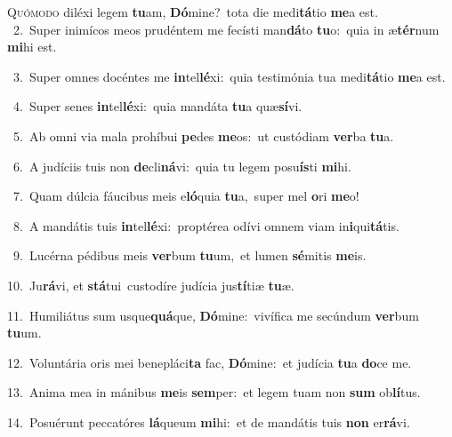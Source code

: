\lettrine{\initial\textcolor{\initialcolor}{Q}}{uómodo} diléxi legem \textbf{tu}\-am, \textbf{Dó}\-mine?~\star tota die medi\-\textbf{tá}\-tio \textbf{me}\-a est.\\
{\numbfont\textcolor{\numbcolor}{~2.}}~Super inimícos meos prudéntem me fecísti man\-\textbf{dá}\-to \textbf{tu}\-o:~\star quia in æ\-\textbf{tér}\-num \textbf{mi}\-hi est.\par
{\numbfont\textcolor{\numbcolor}{~3.}}~Super omnes docéntes me \textbf{in}\-tel\-\textbf{lé}\-xi:~\star quia testimónia tua medi\-\textbf{tá}\-tio \textbf{me}\-a est.\par
{\numbfont\textcolor{\numbcolor}{~4.}}~Super senes \textbf{in}\-tel\-\textbf{lé}\-xi:~\star quia mandáta \textbf{tu}\-a quæ\-\textbf{sí}\-vi.\par
{\numbfont\textcolor{\numbcolor}{~5.}}~Ab omni via mala prohíbui \textbf{pe}\-des \textbf{me}\-os:~\star ut custódiam \textbf{ver}\-ba \textbf{tu}\-a.\par
{\numbfont\textcolor{\numbcolor}{~6.}}~A judíciis tuis non \textbf{de}\-cli\-\textbf{ná}\-vi:~\star quia tu legem posu\-\textbf{ís}\-ti \textbf{mi}\-hi.\par
{\numbfont\textcolor{\numbcolor}{~7.}}~Quam dúlcia fáucibus meis e\-\textbf{ló}\-quia \textbf{tu}\-a,~\star super mel \textbf{o}\-ri \textbf{me}\-o!\par
{\numbfont\textcolor{\numbcolor}{~8.}}~A mandátis tuis \textbf{in}\-tel\-\textbf{lé}\-xi:~\star proptérea odívi omnem viam in\-\textbf{i}\-qui\-\textbf{tá}\-tis.\par
{\numbfont\textcolor{\numbcolor}{~9.}}~Lucérna pédibus meis \textbf{ver}\-bum \textbf{tu}\-um,~\star et lumen \textbf{sé}\-mitis \textbf{me}\-is.\par
{\numbfont\textcolor{\numbcolor}{10.}}~Ju\-\textbf{rá}\-vi, et \textbf{stá}\-tui~\star custodíre judícia jus\-\textbf{tí}\-tiæ \textbf{tu}\-æ.\par
{\numbfont\textcolor{\numbcolor}{11.}}~Humiliátus sum usque\-\textbf{quá}\-que, \textbf{Dó}\-mine:~\star vivífica me secúndum \textbf{ver}\-bum \textbf{tu}\-um.\par
{\numbfont\textcolor{\numbcolor}{12.}}~Voluntária oris mei benepláci\textbf{ta} fac, \textbf{Dó}\-mine:~\star et judícia \textbf{tu}\-a \textbf{do}\-ce me.\par
{\numbfont\textcolor{\numbcolor}{13.}}~Anima mea in mánibus \textbf{me}\-is \textbf{sem}\-per:~\star et legem tuam non \textbf{sum} ob\-\textbf{lí}\-tus.\par
{\numbfont\textcolor{\numbcolor}{14.}}~Posuérunt peccatóres \textbf{lá}\-queum \textbf{mi}\-hi:~\star et de mandátis tuis \textbf{non} er\-\textbf{rá}\-vi.\par
